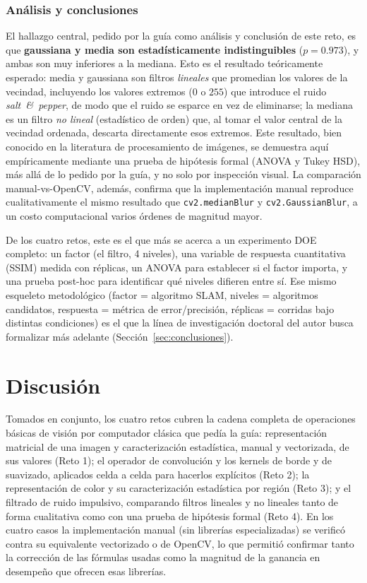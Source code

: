 \documentclass[11pt]{article}
\begin{document}
\subsubsection{Análisis y conclusiones}
El hallazgo central, pedido por la guía como análisis y conclusión de este
reto, es que \textbf{gaussiana y media son estadísticamente
indistinguibles} ($p=0.973$), y ambas son muy inferiores a la mediana. Esto
es el resultado teóricamente esperado: media y gaussiana son filtros
\emph{lineales} que promedian los valores de la vecindad, incluyendo los
valores extremos ($0$ o $255$) que introduce el ruido \emph{salt~\&~pepper},
de modo que el ruido se esparce en vez de eliminarse; la mediana es un
filtro \emph{no lineal} (estadístico de orden) que, al tomar el valor
central de la vecindad ordenada, descarta directamente esos extremos. Este
resultado, bien conocido en la literatura de procesamiento de imágenes, se
demuestra aquí empíricamente mediante una prueba de hipótesis formal (ANOVA
y Tukey HSD), más allá de lo pedido por la guía, y no solo por inspección
visual. La comparación manual-vs-OpenCV, además, confirma que la
implementación manual reproduce cualitativamente el mismo resultado que
\texttt{cv2.medianBlur} y \texttt{cv2.GaussianBlur}, a un costo
computacional varios órdenes de magnitud mayor.

De los cuatro retos, este es el que más se acerca a un experimento DOE
completo: un factor (el filtro, 4 niveles), una variable de respuesta
cuantitativa (SSIM) medida con réplicas, un ANOVA para establecer si el
factor importa, y una prueba post-hoc para identificar qué niveles difieren
entre sí. Ese mismo esqueleto metodológico (factor = algoritmo SLAM,
niveles = algoritmos candidatos, respuesta = métrica de error/precisión,
réplicas = corridas bajo distintas condiciones) es el que la línea de
investigación doctoral del autor busca formalizar más adelante
(Sección~\ref{sec:conclusiones}).

\section{Discusión}
Tomados en conjunto, los cuatro retos cubren la cadena completa de
operaciones básicas de visión por computador clásica que pedía la
guía: representación matricial de una imagen y caracterización
estadística, manual y vectorizada, de sus valores (Reto 1); el operador de
convolución y los kernels de borde y de suavizado, aplicados celda a celda
para hacerlos explícitos (Reto 2); la representación de color y su
caracterización estadística por región (Reto 3); y el filtrado de ruido
impulsivo, comparando filtros lineales y no lineales tanto de forma
cualitativa como con una prueba de hipótesis formal (Reto 4). En los cuatro
casos la implementación manual (sin librerías especializadas) se verificó
contra su equivalente vectorizado o de OpenCV, lo que permitió confirmar
tanto la corrección de las fórmulas usadas como la magnitud de la ganancia
en desempeño que ofrecen esas librerías.
\end{document}
